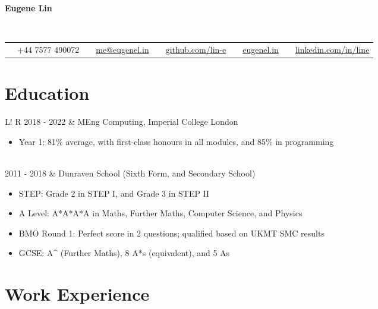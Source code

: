 \documentclass[10pt, a4paper]{article}
\newcommand\vsep{\color{lightgray} \vrule width 0.5pt}
\newcommand\sect[1]{\section*{\Large\sc #1}}
\begin{document}
        \begin{center}
            \bfseries\huge\sc Eugene Lin
        \end{center}
        \
        \begin{tabular*}{0.99\textwidth}{@{\extracolsep{\fill}} ccccc}
            \faPhone \ \ +44 7577 490072 &
            \faEnvelope \ \ \href{mailto:me@eugenel.in}{me@eugenel.in} &
            \faGithub \ \ \href{https://github.com/lin-e/}{github.com/lin-e} &
            \faGlobe \ \ \href{https://eugenel.in/}{eugenel.in} &
            \faLinkedinSquare \ \ \href{https://www.linkedin.com/in/line/}{linkedin.com/in/line}
        \end{tabular*}
        \sect{Education}
            \begin{tabular}{L!{\vsep}R}
                2018 - 2022 & MEng Computing, Imperial College London
                \begin{itemize}
                    \item Year 1: 81\% average, with first-class honours in all modules, and 85\% in programming
                    \vspace{-\baselineskip}
                \end{itemize} \\
                2011 - 2018 & Dunraven School (Sixth Form, and Secondary School)
                \begin{itemize}
                    \item STEP: Grade 2 in STEP I, and Grade 3 in STEP II
                    \item A Level: A*A*A*A in Maths, Further Maths, Computer Science, and Physics
                    \item BMO Round 1: Perfect score in 2 questions; qualified based on UKMT SMC results
                    \item GCSE: A\^{} (Further Maths), 8 A*s (equivalent), and 5 As
                    \vspace{-\baselineskip}
                \end{itemize}
            \end{tabular}
        \sect{Work Experience}
\end{document}
